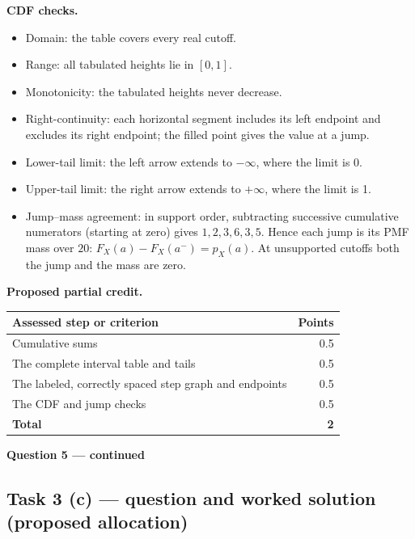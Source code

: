 \textbf{CDF checks.}
\begin{itemize}
\item Domain: the table covers every real cutoff.
\item Range: all tabulated heights lie in $[0,1]$.
\item Monotonicity: the tabulated heights never decrease.
\item Right-continuity: each horizontal segment includes its left endpoint and excludes its right endpoint; the filled point gives the value at a jump.
\item Lower-tail limit: the left arrow extends to $-\infty$, where the limit is 0.
\item Upper-tail limit: the right arrow extends to $+\infty$, where the limit is 1.
\item Jump--mass agreement: in support order, subtracting successive cumulative numerators (starting at zero) gives $1,2,3,6,3,5$. Hence each jump is its PMF mass over $20$: $F_X(a)-F_X(a^-)=p_X(a)$. At unsupported cutoffs both the jump and the mass are zero.
\end{itemize}

\par\smallskip
\noindent\begin{minipage}{\linewidth}
\textbf{Proposed partial credit.}\par\smallskip
\begin{tabularx}{\linewidth}{@{}>{\raggedright\arraybackslash}X r@{}}\toprule
\textbf{Assessed step or criterion} & \textbf{Points}\\\midrule
Cumulative sums & 0.5\\
The complete interval table and tails & 0.5\\
The labeled, correctly spaced step graph and endpoints & 0.5\\
The CDF and jump checks & 0.5\\
\midrule
\textbf{Total} & \textbf{2}\\
\bottomrule\end{tabularx}
\end{minipage}\par\smallskip

\par\vspace{3mm}\secInicio[][sec:q5]

\clearpage
\textbf{Question 5 --- continued}

\subsection*{Task 3 (c) --- question and worked solution (proposed allocation) }
\label{sol:q5t3}

